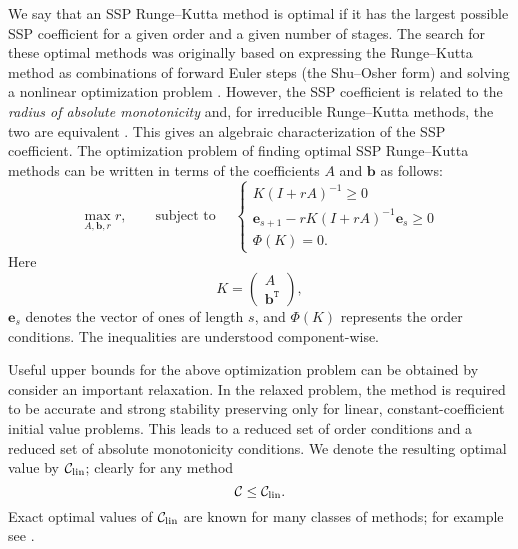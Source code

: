 We say that an SSP Runge--Kutta method is optimal if it has the largest possible SSP coefficient for a given order and a given number of stages.
The search for these optimal methods was originally based on expressing the Runge--Kutta method as combinations of forward Euler steps (the Shu--Osher form) and solving a nonlinear optimization problem \cite{Gottlieb1998, Gottlieb2001, Spiteri2003a, Spiteri2003b, Ruuth2004}.
However, the SSP coefficient is related to the \emph{radius of absolute monotonicity} \cite{Kraaijevanger1991} and, for irreducible Runge--Kutta methods, the two are equivalent \cite{Ferracina2004, Higueras2004}.
This gives an algebraic characterization of the SSP coefficient.
The optimization problem of finding optimal SSP Runge--Kutta methods
can be written in terms of the coefficients $A$ and $\bm{b}$ as
follows:
\begin{equation}\label{eq:SSP_opt}
    \max_{A, \bm{b}, r} r, \qquad \text{subject to } \quad \left\{
                                                 \begin{array}{ll}
                                                   K(I + rA)^{-1} \geq 0 \\
                                                   \bm{e}_{s+1} - rK(I + rA)^{-1}\bm{e}_{s} \geq 0 \\
                                                   \Phi(K) = 0.
                                                 \end{array}
                                               \right.
\end{equation}
Here
\begin{equation*}
    K = \left(
            \begin{array}{c}
                     A              \\
                     \bm{b}^{\texttt{T}}
            \end{array}
         \right),
\end{equation*}
$\bm{e}_s$ denotes the vector of ones of length $s$,
and \( \Phi(K) \) represents the  order conditions.
The inequalities are understood component-wise.

Useful upper bounds for the above optimization problem can be obtained by consider an important relaxation. 
In the relaxed problem, the method is required to be accurate and strong stability preserving only for linear, constant-coefficient initial value problems. 
This leads to a reduced set of order conditions and a reduced set of absolute monotonicity conditions.
We denote the resulting optimal value by $\mathcal{C}_{\text{lin}}$; clearly for any method
\begin{equation*}
	\mathcal{C}\le\mathcal{C}_{\text{lin}}.
\end{equation*}
Exact optimal values of $\mathcal{C}_{\text{lin}}$ are known for many classes of methods; for example see \cite{Kraaijevanger1986,ketcheson2009a}.

